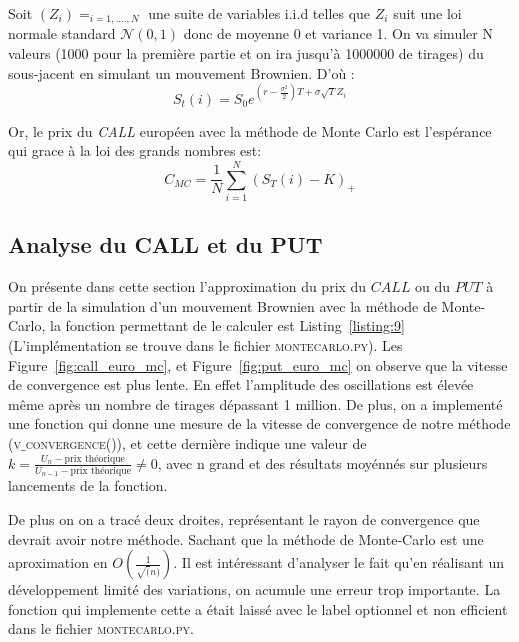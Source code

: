 Soit $(Z_{i})= _{i=1,....,N}$ une suite de variables i.i.d telles que $Z_{i}$ suit une loi normale standard $\mathcal{N}(0,1)$ donc de moyenne 0 et variance 1. On va simuler N valeurs (1000 pour la première partie et  on ira jusqu'à 1000000 de tirages) du sous-jacent en simulant un mouvement Brownien. D'où : \[S_{t}(i)=S_{0}e^{(r-\frac{\sigma^{2}}{2})T+\sigma\sqrt{T}Z_{i}}\]

Or, le prix du {\slshape CALL} européen avec la méthode de Monte Carlo est l'espérance qui grace à la loi des grands nombres est:
\[C_{MC}=\frac{1}{N}\sum_{i=1}^{N} (S_{T}(i)-K)_{+}\]

\subsection{Analyse du CALL et du PUT} %
\label{sub:analyse_du_call_et_du_put}

On présente dans cette section l'approximation du prix du $CALL$ ou du $PUT$ à partir de la simulation d'un mouvement Brownien avec la méthode
 de Monte-Carlo, la fonction permettant de le calculer est Listing~\ref{listing:9} (L'implémentation se trouve dans le fichier \textsc{montecarlo.py}). Les Figure~\ref{fig:call_euro_mc}, et Figure~\ref{fig:put_euro_mc} on observe que la vitesse de convergence est
   plus lente. En effet l'amplitude des oscillations est élevée même après un nombre de tirages dépassant 1 million. De plus, on a implementé
    une fonction qui donne une mesure de la vitesse de convergence de notre méthode (\textsc{v$\_$convergence()}), et cette dernière indique une
	 valeur de $k=\frac{U_n-\text{prix théorique}}{U_{n-1}-\text{prix théorique}}  \neq 0$, avec n grand et des résultats moyénnés sur plusieurs lancements de la  fonction.

De plus on on a tracé deux droites, représentant le rayon de convergence que devrait avoir notre méthode. Sachant que la méthode de Monte-Carlo est une aproximation en $O(\frac{1}{\sqrt(n)})$. Il est intéressant d'analyser le fait qu'en réalisant un développement limité des variations, on acumule une erreur trop importante. La fonction qui implemente cette a était laissé avec le label optionnel et non efficient dans le fichier \textsc{montecarlo.py}.



